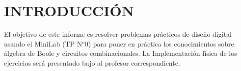 \section{INTRODUCCIÓN}
\sangria{} El objetivo de este informe es resolver problemas prácticos de diseño digital usando el MiniLab (TP N$^o0$) para poner en práctica los conocimientos sobre álgebra de Boole y circuitos combinacionales.
\sangria{} La Implementación física de los ejercicios será presentado bajo al profesor correspondiente.
